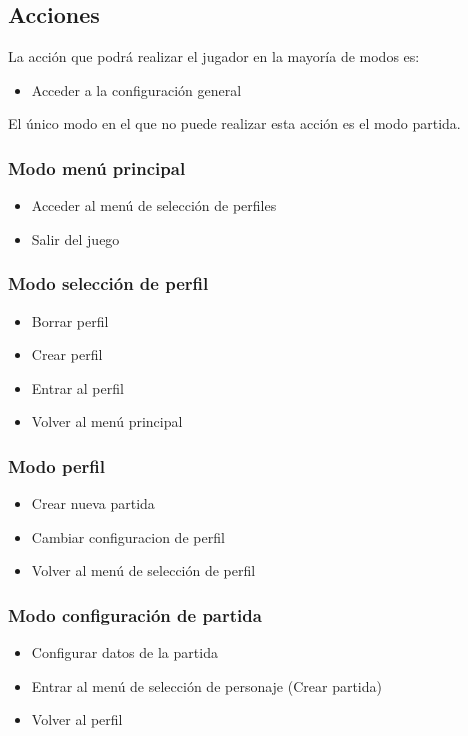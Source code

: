 \subsection{Acciones}


La acción que podrá realizar el jugador en la mayoría de modos es:
\begin{itemize}
    \item Acceder a la configuración general
\end{itemize}
El único modo en el que no puede realizar esta acción es el modo partida.

\subsubsection{Modo menú principal}
\begin{itemize}
    \item Acceder al menú de selección de perfiles
    \item Salir del juego
\end{itemize}

\subsubsection{Modo selección de perfil}
\begin{itemize}
    \item Borrar perfil
    \item Crear perfil
    \item Entrar al perfil
    \item Volver al menú principal
\end{itemize}

\subsubsection{Modo perfil}
\begin{itemize}
    \item Crear nueva partida
    \item Cambiar configuracion de perfil
    \item Volver al menú de selección de perfil
\end{itemize}

\subsubsection{Modo configuración de partida}
\begin{itemize}
    \item Configurar datos de la partida
    \item Entrar al menú de selección de personaje (Crear partida)
    \item Volver al perfil
\end{itemize}


